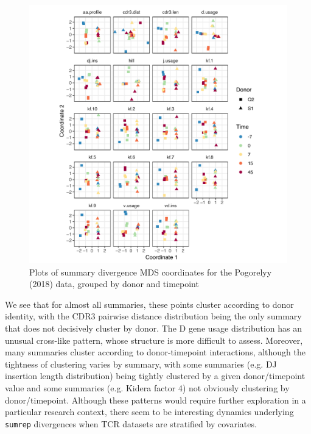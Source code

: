 \documentclass{article}
\begin{document}
\begin{figure}
    \includegraphics[width=\linewidth]{Figures/tcr_pca.pdf}
    \caption{Plots of summary divergence MDS coordinates for the Pogorelyy (2018) data, grouped by donor and timepoint}
    \label{fig:TCR_MDS}
\end{figure}
We see that for almost all summaries, these points cluster according to donor identity, with the CDR3 pairwise distance distribution being the only summary that does not decisively cluster by donor.
The D gene usage distribution has an unusual cross-like pattern, whose structure is more difficult to assess.
Moreover, many summaries cluster according to donor-timepoint interactions, although the tightness of clustering varies by summary, with some summaries (e.g. DJ insertion length distribution) being tightly clustered by a given donor/timepoint value and some summaries (e.g. Kidera factor 4) not obviously clustering by donor/timepoint.
Although these patterns would require further exploration in a particular research context, there seem to be interesting dynamics underlying \texttt{sumrep} divergences when TCR datasets are stratified by covariates.
\end{document}
